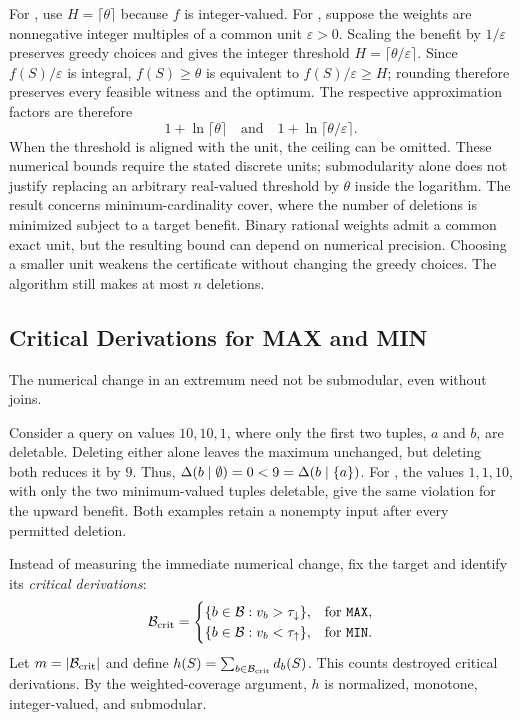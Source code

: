 For , use $H=\lceil\theta\rceil$ because $f$ is
integer-valued. For , suppose the weights are nonnegative
integer multiples of a common unit $\varepsilon>0$. Scaling the
benefit by $1/\varepsilon$ preserves greedy choices and gives the
integer threshold $H=\lceil\theta/\varepsilon\rceil$. Since
$f(S)/\varepsilon$ is integral, $f(S)\ge\theta$ is equivalent to
$f(S)/\varepsilon\ge H$; rounding therefore preserves every feasible
witness and the optimum. The respective
approximation factors are therefore
\begin{equation}
\label{eq:count-sum-bound}
1+\ln\lceil\theta\rceil
\quad\text{and}\quad
1+\ln\lceil\theta/\varepsilon\rceil.
\end{equation}
When the threshold is aligned with the unit, the ceiling can be
omitted. These numerical bounds require the stated discrete units;
submodularity alone does not justify replacing an arbitrary real-valued
threshold by $\theta$ inside the logarithm. The result concerns
minimum-cardinality cover, where the number of deletions is minimized
subject to a target benefit. Binary rational weights admit a common exact
unit, but the resulting bound can depend on numerical precision. Choosing
a smaller unit weakens the certificate without changing the greedy choices.
The algorithm still makes at most $n$ deletions.

\subsection{Critical Derivations for MAX and MIN}
\label{sec:submod-extrema}

The numerical change in an extremum need not be submodular, even
without joins.
\begin{example}
\label{ex:max-nonsubmodular}
Consider a  query on values $10,10,1$, where only the
first two tuples, $a$ and $b$, are deletable. Deleting either alone
leaves the maximum unchanged, but deleting both reduces it by $9$.
Thus, $\Delta(b\mid\emptyset)=0<9=\Delta(b\mid\{a\})$.
For , the values $1,1,10$, with only the two minimum-valued
tuples deletable, give the same violation for the upward benefit.
Both examples retain a nonempty input after every permitted deletion.
\end{example}

Instead of measuring the immediate numerical change, fix the target
and identify its \emph{critical derivations}:
\begin{equation}
\label{eq:critical-derivations}
\mathcal{B}_{\mathrm{crit}}=
\begin{cases}
\{b\in\mathcal{B}:v_b>\tau_{\downarrow}\}, & \text{for \textnormal{\texttt{MAX}}},\\
\{b\in\mathcal{B}:v_b<\tau_{\uparrow}\}, & \text{for \textnormal{\texttt{MIN}}}.
\end{cases}
\end{equation}
Let $m=|\mathcal{B}_{\mathrm{crit}}|$ and define
$h(S)=\sum_{b\in\mathcal{B}_{\mathrm{crit}}}d_b(S)$.
This counts destroyed critical derivations. By the weighted-coverage
argument, $h$ is normalized, monotone, integer-valued, and submodular.

